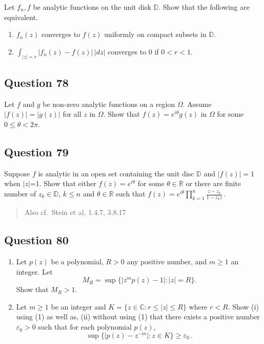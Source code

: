 \documentclass[12pt]{article}
\begin{document}
Let \(f_n, f\) be analytic functions on the unit disk \({\mathbb D}\).
Show that the following are equivalent.

\begin{enumerate}
\def\labelenumi{(\roman{enumi})}
\item
  \(f_n(z)\) converges to \(f(z)\) uniformly on compact subsets in
  \(\mathbb D\).
\item
  \(\int_{|z|= r} |f_n(z) - f(z)| \, |dz|\) converges to \(0\) if
  \(0< r<1\).
\end{enumerate}

\hypertarget{question-78-2}{%
\subsection{Question 78}\label{question-78-2}}

Let \(f\) and \(g\) be non-zero analytic functions on a region
\(\Omega\). Assume \(|f(z)| = |g(z)|\) for all \(z\) in \(\Omega\). Show
that \(f(z) = e^{i \theta} g(z)\) in \(\Omega\) for some
\(0 \leq \theta < 2 \pi\).

\hypertarget{question-79-2}{%
\subsection{Question 79}\label{question-79-2}}

Suppose \(f\) is analytic in an open set containing the unit disc
\(\mathbb D\) and \(|f(z)| =1\) when \(|z|\)=1. Show that either
\(f(z) = e^{i \theta}\) for some \(\theta \in \mathbb R\) or there are
finite number of \(z_k \in \mathbb D\), \(k \leq n\) and
\(\theta \in \mathbb R\) such that
\(\displaystyle f(z) = e^{i\theta} \prod_{k=1}^n \frac{z-z_k}{1 - \bar{z}_k z } \, .\)

\begin{quote}
Also cf.~Stein et al, 1.4.7, 3.8.17
\end{quote}

\hypertarget{question-80-2}{%
\subsection{Question 80}\label{question-80-2}}

\begin{enumerate}
\def\labelenumi{(\arabic{enumi})}
\item
  Let \(p(z)\) be a polynomial, \(R>0\) any positive number, and
  \(m \geq 1\) an integer. Let
  \[M_R = \sup \{ |z^{m} p(z) - 1|: |z| = R  \}.\] Show that \(M_R>1\).
\item
  Let \(m \geq 1\) be an integer and
  \(K = \{z \in {\mathbb C}: r \leq |z| \leq R \}\) where \(r<R\). Show
  (i) using (1) as well as, (ii) without using (1) that there exists a
  positive number \(\varepsilon_0>0\) such that for each polynomial
  \(p(z)\),
  \[\sup \{|p(z) - z^{-m}|: z \in K  \} \geq \varepsilon_0 \, .\]
\end{enumerate}
\end{document}
